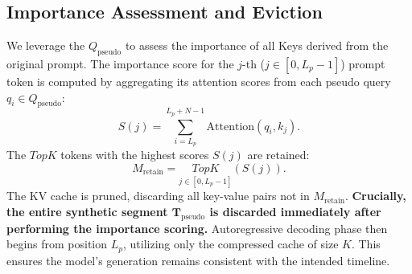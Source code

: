 \subsection{Importance Assessment and Eviction}
We leverage the \(Q_{\text{pseudo}}\) to assess the importance of all Keys derived from the original prompt. The importance score for the \(j\)-th (\(j \in [0, L_p - 1]\)) prompt token is computed by aggregating its attention scores from each pseudo query \(q_i \in Q_{\text{pseudo}}\):
\begin{equation}
S(j) = \sum_{i=L_p}^{L_p+N-1} \text{Attention}(q_i, k_j).
\end{equation}
The \(TopK\) tokens with the highest scores \(S(j)\) are retained:
\begin{equation}
M_{\text{retain}} = \underset{j \in [0, L_p - 1]}{TopK}\left( S(j) \right).
\end{equation}
The KV cache is pruned, discarding all key-value pairs not in \(M_{\text{retain}}\). \textbf{Crucially, the entire synthetic segment \(\mathbf{T}_{\text{pseudo}}\) is discarded immediately after performing the importance scoring.} Autoregressive decoding phase then begins from position \(L_p\), utilizing only the compressed cache of size \(K\). This ensures the model's generation remains consistent with the intended timeline.



